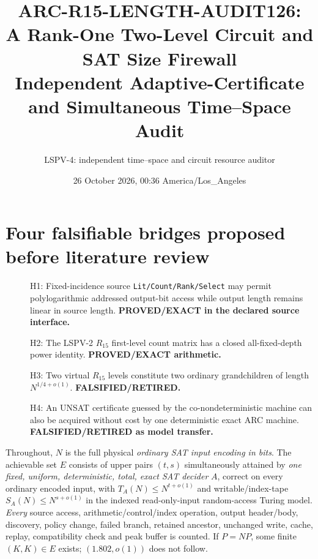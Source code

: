 \documentclass[11pt]{article}
\title{ARC-R15-LENGTH-AUDIT126:\\ A Rank-One Two-Level Circuit and SAT Size Firewall\\\large Independent Adaptive-Certificate and Simultaneous Time--Space Audit}
\author{LSPV-4: independent time--space and circuit resource auditor}
\date{26 October 2026, 00:36 America/Los\_Angeles}
\begin{document}
\maketitle
\begin{center}
\end{center}

\section{Four falsifiable bridges proposed before literature review}
\begin{description}
\item[] H1: Fixed-incidence source \texttt{Lit/Count/Rank/Select} may permit polylogarithmic addressed output-bit access while output length remains linear in source length. \textbf{PROVED/EXACT in the declared source interface.}
\item[] H2: The LSPV-2 $R_{15}$ first-level count matrix has a closed all-fixed-depth power identity. \textbf{PROVED/EXACT arithmetic.}
\item[] H3: Two virtual $R_{15}$ levels constitute two ordinary grandchildren of length $N^{1/4+o(1)}$. \textbf{FALSIFIED/RETIRED.}
\item[] H4: An UNSAT certificate guessed by the co-nondeterministic machine can also be acquired without cost by one deterministic exact ARC machine. \textbf{FALSIFIED/RETIRED as model transfer.}
\end{description}
Throughout, $N$ is the full physical \emph{ordinary SAT input encoding in bits}. The achievable set $E$ consists of upper pairs $(t,s)$ simultaneously attained by \emph{one fixed, uniform, deterministic, total, exact SAT decider} $A$, correct on every ordinary encoded input, with $T_A(N)\le N^{t+o(1)}$ and writable/index-tape $S_A(N)\le N^{s+o(1)}$ in the indexed read-only-input random-access Turing model. \emph{Every} source access, arithmetic/control/index operation, output header/body, discovery, policy change, failed branch, retained ancestor, unchanged write, cache, replay, compatibility check and peak buffer is counted. If $P=NP$, some finite $(K,K)\in E$ exists; $(1.802,o(1))$ does not follow.
\end{document}
